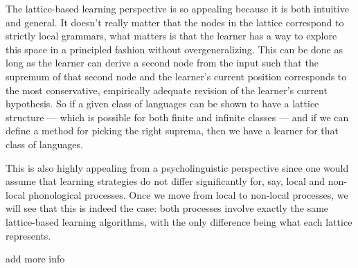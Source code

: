 The lattice-based learning perspective is so appealing because it is both intuitive and general.
It doesn't really matter that the nodes in the lattice correspond to strictly local grammars, what matters is that the learner has a way to explore this space in a principled fashion without overgeneralizing.
This can be done as long as the learner can derive a second node from the input such that the supremum of that second node and the learner's current position corresponds to the most conservative, empirically adequate revision of the learner's current hypothesis.
So if a given class of languages can be shown to have a lattice structure --- which is possible for both finite and infinite classes --- and if we can define a method for picking the right suprema, then we have a learner for that class of languages.

This is also highly appealing from a psycholinguistic perspective since one would assume that learning strategies do not differ significantly for, say, local and non-local phonological processes.
Once we move from local to non-local processes, we will see that this is indeed the case: both processes involve exactly the same lattice-based learning algorithms, with the only difference being what each lattice represents.

\begin{literature}
add more info
\end{literature}
